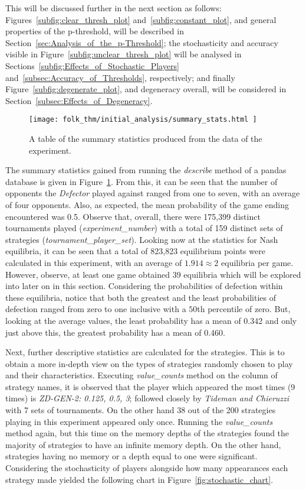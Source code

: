 This will be discussed further in the next section as follows:
Figures~\ref{subfig:clear_thresh_plot} and~\ref{subfig:constant_plot}, and
general properties of the p-threshold, will be described in
Section~\ref{sec:Analysis_of_the_p-Threshold}; the stochasticity and accuracy
visible in Figure~\ref{subfig:unclear_thresh_plot} will be analysed in
Sections~\ref{subfig:Effects_of_Stochastic_Players}
and~\ref{subsec:Accuracy_of_Thresholds}, respectively; and finally
Figure~\ref{subfig:degenerate_plot}, and degeneracy overall, will be considered
in Section~\ref{subsec:Effects_of_Degeneracy}.

\begin{figure}
    \centering
    \texttt{[image: folk\_thm/initial\_analysis/summary\_stats.html
    ]}
    \caption{A table of the summary statistics produced from the data of the experiment.}\label{fig:summary_stats}
\end{figure}

The summary statistics gained from running the \textit{describe} method of a
pandas database is given in Figure~\ref{fig:summary_stats}. From this, it can be
seen that the number of opponents the \textit{Defector} played against ranged
from one to seven, with an average of four opponents. Also, as expected, the
mean probability of the game ending encountered was 0.5. Observe that, overall,
there were 175,399 distinct tournaments played (\textit{experiment_number}) with
a total of 159 distinct sets of strategies (\textit{tournament_player_set}).
Looking now at the statistics for Nash equilibria, it can be seen that a total
of 823,823 equilibrium points were calculated in this experiment, with an
average of \(1.914 \approx 2\) equilibria per game. However, observe, at least
one game obtained 39 equilibria which will be explored into later on in this
section. Considering the probabilities of defection within these equilibria,
notice that both the greatest and the least probabilities of defection ranged
from zero to one inclusive with a \(50\)th percentile of zero. But, looking at
the average values, the least probability has a mean of 0.342 and only just
above this, the greatest probability has a mean of 0.460.

Next, further descriptive statistics are calculated for the strategies. This is
to obtain a more in-depth view on the types of strategies randomly chosen to
play and their characteristics. Executing \textit{value_counts} method on the
column of strategy names, it is observed that the player which appeared the most
times (9 times) is \textit{ZD-GEN-2: 0.125, 0.5, 3}; followed closely by
\textit{Tideman and Chieruzzi} with 7 sets of tournaments. On the other hand 38
out of the 200 strategies playing in this experiment appeared only once.
Running the \textit{value_counts} method again, but this time on the memory
depths of the strategies found the majority of strategies to have an infinite
memory depth. On the other hand, strategies having no memory or a depth equal to
one were significant. Considering the stochasticity of players alongside how
many appearances each strategy made yielded the following chart in
Figure~\ref{fig:stochastic_chart}.

